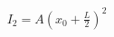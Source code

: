 \documentclass[preview]{standalone}
\begin{document}
\begin{align*}
I_2 = A\!\left(x_0 + \tfrac{L}{2}\right)^2
\end{align*}
\end{document}
